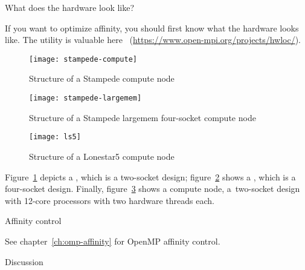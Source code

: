  {What does the hardware look like?}

If you want to optimize affinity, you should first know what the
hardware looks like. The  utility is valuable
here~\cite{goglin:hwloc} (\url{https://www.open-mpi.org/projects/hwloc/}).

\begin{figure}[ht]
  \texttt{[image: stampede-compute]}
  \caption{Structure of a Stampede compute node}
  \label{fig:stampede-compute-hwloc}
\end{figure}

\begin{figure}[p]
  \texttt{[image: stampede-largemem]}
  \caption{Structure of a Stampede largemem four-socket compute node}
  \label{fig:stampede-largemem-hwloc}
\end{figure}

\begin{figure}[ht]
  \texttt{[image: ls5]}
  \caption{Structure of a Lonestar5 compute node}
  \label{fig:ls5-compute-hwloc}
\end{figure}

Figure~\ref{fig:stampede-compute-hwloc} depicts a
, which is a two-socket
 design;
figure~\ref{fig:stampede-largemem-hwloc} shows a 
, which is a four-socket design.
%
Finally, figure~\ref{fig:ls5-compute-hwloc} shows a
 compute node, a~two-socket design with 12-core
 processors with two hardware threads
each.

 {Affinity control}

See chapter~\ref{ch:omp-affinity} for OpenMP affinity control.


 {Discussion}

